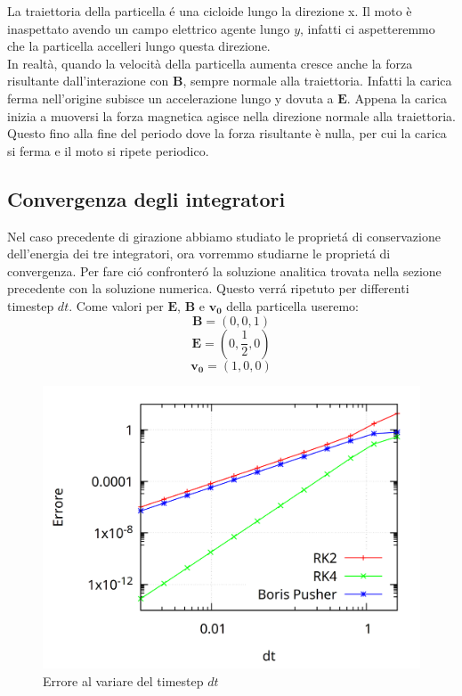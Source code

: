 \documentclass[11pt]{article}
\begin{document}
La traiettoria della particella é una cicloide lungo la direzione x. Il moto è inaspettato avendo un campo elettrico agente lungo $y$, infatti ci aspetteremmo che la particella accelleri lungo questa direzione.\\
In realt\`a, quando la velocit\`a della particella aumenta cresce anche la forza risultante dall'interazione con $\mathbf{B}$, sempre normale alla traiettoria.
Infatti la carica ferma nell'origine subisce un accelerazione lungo y dovuta a $\mathbf{E}$. Appena la carica inizia a muoversi la forza magnetica agisce nella direzione normale alla traiettoria. Questo fino alla fine del periodo dove la forza risultante è nulla, per cui la carica si ferma e il moto si ripete periodico.\\


\subsection{Convergenza degli integratori}

Nel caso precedente di girazione abbiamo studiato le proprietá di conservazione dell'energia dei tre integratori, ora vorremmo studiarne le proprietá di convergenza.
Per fare ció confronteró la soluzione analitica trovata nella sezione precedente con la soluzione numerica. Questo verrá ripetuto per differenti timestep $dt$.
Come valori per $\mathbf{E}$, $\mathbf{B}$ e $\mathbf{v_0}$ della particella useremo:
$$\mathbf{B}=(0,0,1) $$
$$\mathbf{E}=(0,\frac{1}{2},0) $$
$$\mathbf{v_0} = (1,0,0)$$
\begin{figure}[ht]
  \includegraphics[width=.9\linewidth]{img/convergenza.png}  
  \caption{Errore al variare del timestep $dt$}
\end{figure}%
\end{document}
